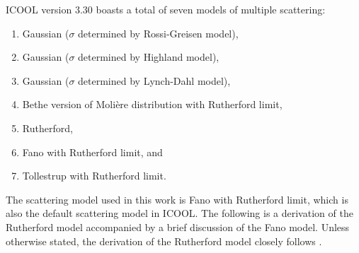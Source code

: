  \label{sec:ICOOLScattering} \par
ICOOL version 3.30 \cite{icool} boasts a total of seven models of multiple scattering:
\begin{enumerate}
\item Gaussian ($\sigma$ determined by Rossi-Greisen model),
\item Gaussian ($\sigma$ determined by Highland model),
\item Gaussian ($\sigma$ determined by Lynch-Dahl model),
\item Bethe version of Moli\`{e}re distribution with Rutherford limit,
\item Rutherford,
\item Fano with Rutherford limit, and
\item Tollestrup with Rutherford limit.
\end{enumerate}
The scattering model used in this work is Fano with Rutherford limit, which is also the default scattering model in ICOOL. The following is a derivation of the Rutherford model accompanied by a brief discussion of the Fano model. Unless otherwise stated, the derivation of the Rutherford model closely follows \cite{griffithsqm}.

